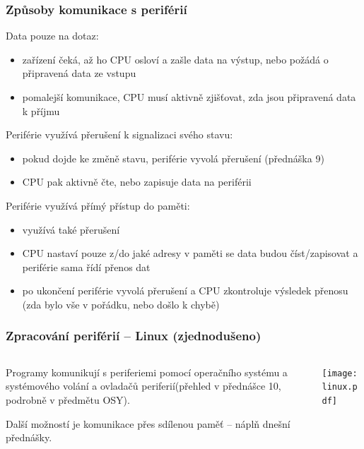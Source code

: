 \documentclass{beamer}
\begin{document}
\begin{frame}
\frametitle{Způsoby komunikace s periférií}
Data pouze na dotaz:
\begin{itemize}
\item zařízení čeká, až ho CPU osloví a zašle data na výstup, nebo požádá o připravená data ze vstupu
\item pomalejší komunikace, CPU musí aktivně zjišťovat, zda jsou připravená data k příjmu
\end{itemize}

Periférie využívá přerušení k signalizaci svého stavu:
\begin{itemize}
\item pokud dojde ke změně stavu, periférie vyvolá přerušení (přednáška 9)
\item CPU pak aktivně čte, nebo zapisuje data na periférii
\end{itemize}

Periférie využívá přímý přístup do paměti:
\begin{itemize}
\item využívá také přerušení
\item CPU nastaví pouze z/do jaké adresy v paměti se data budou číst/zapisovat a periférie sama řídí přenos dat
\item po ukončení periférie vyvolá přerušení a CPU zkontroluje výsledek přenosu (zda bylo vše v pořádku, nebo došlo k chybě)
\end{itemize}

\end{frame}

\begin{frame}
\frametitle{Zpracování periférií -- Linux (zjednodušeno)}
\begin{columns}
\begin{column}{0.4\textwidth}
Programy komunikují s periferiemi pomocí operačního systému a systémového volání a ovladačů periferií(přehled v přednášce 10, podrobně v předmětu OSY).

\bigskip
Další možností je komunikace přes sdílenou paměť -- náplň dnešní přednášky.
\end{column}
\begin{column}{0.58\textwidth}  
\texttt{[image: linux.pdf]}
\end{column}
\end{columns}
\end{frame}
\end{document}
